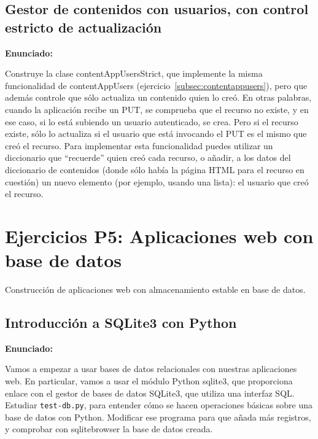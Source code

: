 \subsection{Gestor de contenidos con usuarios, con control estricto de actualización}
\label{subsec:contentappusersstrict}

\textbf{Enunciado:}

Construye la clase contentAppUsersStrict, que implemente la misma funcionalidad de contentAppUsers (ejercicio~\ref{subsec:contentappusers}), pero que además controle que sólo actualiza un contenido quien lo creó. En otras palabras, cuando la aplicación recibe un PUT, se comprueba que el recurso no existe, y en ese caso, si lo está subiendo un usuario autenticado, se crea. Pero si el recurso existe, sólo lo actualiza si el usuario que está invocando el PUT es el mismo que creó el recurso. Para implementar esta funcionalidad puedes utilizar un diccionario que ``recuerde'' quien creó cada recurso, o añadir, a los datos del diccionario de contenidos (donde sólo había la página HTML para el recurso en cuestión) un nuevo elemento (por ejemplo, usando una lista): el usuario que creó el recurso.


\section{Ejercicios P5: Aplicaciones web con base de datos}

Construcción de aplicaciones web con almacenamiento estable en base de datos.

\subsection{Introducción a SQLite3 con Python}
\label{subsec:sqlite3-python}

\textbf{Enunciado:}

Vamos a empezar a usar bases de datos relacionales con nuestras aplicaciones web. En particular, vamos a usar el módulo Python sqlite3, que proporciona enlace con el gestor de bases de datos SQLite3, que utiliza una interfaz SQL. Estudiar \texttt{test-db.py}, para entender cómo se hacen operaciones básicas sobre una base de datos con Python. Modificar ese programa para que añada más registros, y comprobar con sqlitebrowser la base de datos creada.

